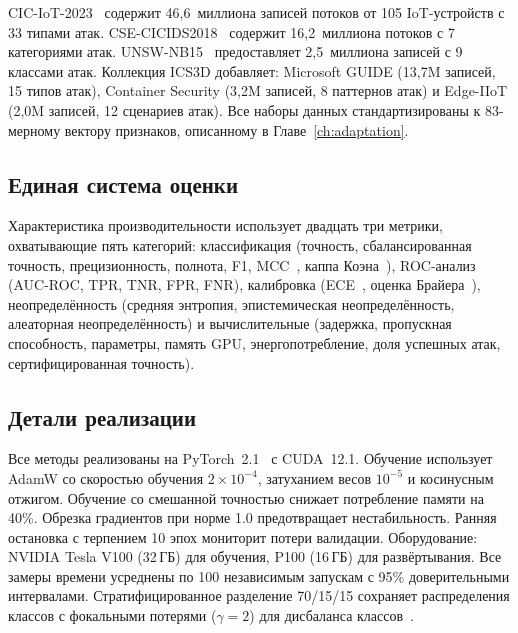 CIC-IoT-2023~\cite{Neto2023,Ring2019} содержит 46,6~миллиона записей потоков от 105 IoT-устройств с 33 типами атак. CSE-CICIDS2018~\cite{Sharafaldin2018} содержит 16,2~миллиона потоков с 7 категориями атак. UNSW-NB15~\cite{Moustafa2015,Mirsky2018} предоставляет 2,5~миллиона записей с 9 классами атак. Коллекция ICS3D добавляет: Microsoft GUIDE (13,7M записей, 15 типов атак), Container Security (3,2M записей, 8 паттернов атак) и Edge-IIoT (2,0M записей, 12 сценариев атак). Все наборы данных стандартизированы к 83-мерному вектору признаков, описанному в Главе~\ref{ch:adaptation}.

\subsection{Единая система оценки}

Характеристика производительности использует двадцать три метрики, охватывающие пять категорий: классификация (точность, сбалансированная точность, прецизионность, полнота, F1, MCC~\cite{Matthews1975}, каппа Коэна~\cite{Cohen1960}), ROC-анализ (AUC-ROC, TPR, TNR, FPR, FNR), калибровка (ECE~\cite{Naeini2015}, оценка Брайера~\cite{Brier1950}), неопределённость (средняя энтропия, эпистемическая неопределённость, алеаторная неопределённость) и вычислительные (задержка, пропускная способность, параметры, память GPU, энергопотребление, доля успешных атак, сертифицированная точность).

\subsection{Детали реализации}

Все методы реализованы на PyTorch~2.1~\cite{Paszke2019} с CUDA~12.1. Обучение использует AdamW со скоростью обучения $2\times10^{-4}$, затуханием весов $10^{-5}$ и косинусным отжигом. Обучение со смешанной точностью снижает потребление памяти на 40\%. Обрезка градиентов при норме 1.0 предотвращает нестабильность. Ранняя остановка с терпением 10 эпох мониторит потери валидации. Оборудование: NVIDIA Tesla V100 (32\,ГБ) для обучения, P100 (16\,ГБ) для развёртывания. Все замеры времени усреднены по 100 независимым запускам с 95\% доверительными интервалами. Стратифицированное разделение 70/15/15 сохраняет распределения классов с фокальными потерями ($\gamma=2$) для дисбаланса классов~\cite{Lin2017focal}.

\label{sec:benchmark_results}%

